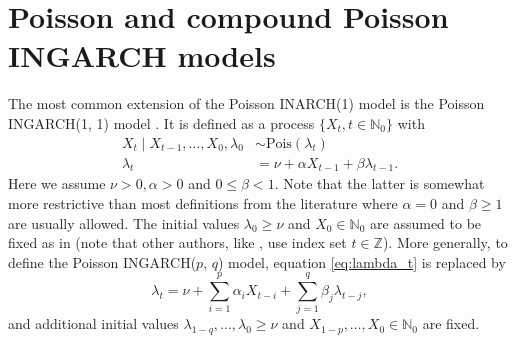 \documentclass{article}
\begin{document}
\section{Poisson and compound Poisson INGARCH models}
\label{sec:original_formulation}

The most common extension of the Poisson INARCH(1) model is the Poisson INGARCH(1, 1) model \cite{Ferland2006, Fokianos2009}. It is defined as a process $\{X_t, t \in \mathbb{N}_0\}$ with
\begin{align}
X_t \mid X_{t - 1}, \dots, X_0, \lambda_0 & \sim \text{Pois}(\lambda_t)\label{eq:X_t_original}\\
\lambda_t & = \nu + \alpha X_{t - 1} + \beta \lambda_{t - 1}. \label{eq:lambda_t}
\end{align}
Here we assume $\nu > 0, \alpha > 0$ and $0 \leq \beta < 1$. Note that the latter is somewhat more restrictive than most definitions from the literature where $\alpha = 0$ and $\beta \geq 1$ are usually allowed. The initial values $\lambda_0 \geq \nu$ and $X_0 \in \mathbb{N}_0$ are assumed to be fixed as in \cite{Fokianos2009} (note that other authors, like \citep{Ferland2006}, use index set $t \in \mathbb{Z}$). More generally, to define the Poisson INGARCH($p$, $q$) model, equation \eqref{eq:lambda_t} is replaced by
\begin{equation}
\lambda_t = \nu + \sum_{i = 1}^p \alpha_i X_{t - i} + \sum_{j = 1}^q \beta_j \lambda_{t - j},\label{eq:lambda_t_pq}
\end{equation}
and additional initial values $\lambda_{1 - q}, \dots, \lambda_0 \geq \nu$ and $X_{1 - p}, \dots, X_0 \in \mathbb{N}_0$ are fixed.
\end{document}
